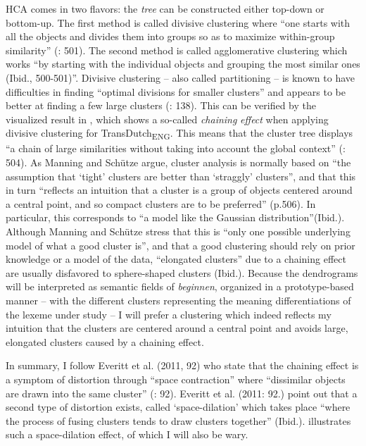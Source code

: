 HCA comes in two flavors: the \textit{tree} can be constructed either top-down or bottom-up. The first method is called divisive clustering where “one starts with all the objects and divides them into groups so as to maximize within-group similarity” (\citealt{manning_foundations_1999}: 501). The second method is called agglomerative clustering which works “by starting with the individual objects and grouping the most similar ones (Ibid., 500-501)”. Divisive clustering – also called partitioning – is known to have difficulties in finding “optimal divisions for smaller clusters” and appears to be better at finding a few large clusters (\citealt{baayen_analyzing_2008}: 138). This can be verified by the visualized result in , which shows a so-called \textit{chaining} \textit{effect} when applying divisive clustering for TransDutch\textsubscript{ENG}. This means that the cluster tree displays “a chain of large similarities without taking into account the global context” (\citealt{manning_foundations_1999}: 504). As Manning and Schütze argue, cluster analysis is normally based on “the assumption that ‘tight’ clusters are better than ‘straggly’ clusters”, and that this in turn “reflects an intuition that a cluster is a group of objects centered around a central point, and so compact clusters are to be preferred” (p.506). In particular, this corresponds to “a model like the Gaussian distribution”(Ibid.). Although Manning and Schütze stress that this is “only one possible underlying model of what a good cluster is”, and that a good clustering should rely on prior knowledge or a model of the data, “elongated clusters” due to a chaining effect are usually disfavored to sphere-shaped clusters (Ibid.). Because the dendrograms will be interpreted as semantic fields of \textit{beginnen}, organized in a prototype-based manner – with the different clusters representing the meaning differentiations of the lexeme under study – I will prefer a clustering which indeed reflects my intuition that the clusters are centered around a central point and avoids large, elongated clusters caused by a chaining effect.



In summary, I follow Everitt et al. (2011, 92) who state that the chaining effect is a symptom of distortion through “space contraction” where “dissimilar objects are drawn into the same cluster” (\citealt{everitt_cluster_2011}: 92). Everitt et al. (2011: 92.) point out that a second type of distortion exists, called ‘space-dilation’ which takes place “where the process of fusing clusters tends to draw clusters together” (Ibid.).  illustrates such a space-dilation effect, of which I will also be wary.


